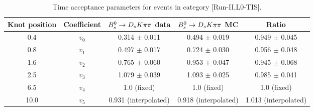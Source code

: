 \begin{table}[hp!]
\centering
\small
\caption{Time acceptance parameters for events in category [\textsf{Run-II},\textsf{L0-TIS}].}
\begin{tabular}{c c c c c}
\hline
\hline
Knot position & Coefficient & ${{B}^0_{s}}\rightarrow{\ensuremath{{D}_{s}}}{\ensuremath{K}}{\ensuremath{\pi}}{\ensuremath{\pi}}$ data & ${{B}^0_{s}}\rightarrow{\ensuremath{{D}_{s}}}{\ensuremath{K}}{\ensuremath{\pi}}{\ensuremath{\pi}}$ MC & Ratio \\
\hline
0.4 & $v_{0}$ & 0.314 $\pm$ 0.011 & 0.494 $\pm$ 0.019 & 0.949 $\pm$ 0.045\\
0.8 & $v_{1}$ & 0.497 $\pm$ 0.017 & 0.724 $\pm$ 0.030 & 0.956 $\pm$ 0.048\\
1.6 & $v_{2}$ & 0.765 $\pm$ 0.060 & 0.953 $\pm$ 0.047 & 0.945 $\pm$ 0.068\\
2.5 & $v_{3}$ & 1.079 $\pm$ 0.039 & 1.093 $\pm$ 0.025 & 0.985 $\pm$ 0.041\\
6.5 & $v_{4}$ &  1.0 (fixed) & 1.0 (fixed) & 1.0 (fixed)\\
10.0 & $v_{5}$ & 0.931 (interpolated) & 0.918 (interpolated) & 1.013 (interpolated) \\
\hline
\hline
\end{tabular}
\label{table:splines}
\end{table}